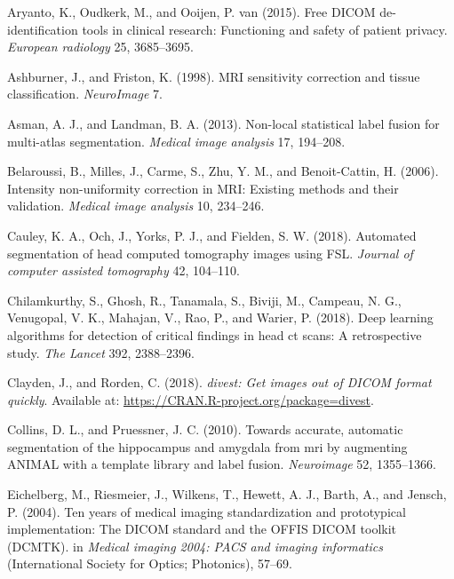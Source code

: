 \documentclass[utf8]{frontiersSCNS}
\begin{document}
\leavevmode\hypertarget{ref-aryanto2015free}{}%
Aryanto, K., Oudkerk, M., and Ooijen, P. van (2015). Free DICOM de-identification tools in clinical research: Functioning and safety of patient privacy. \emph{European radiology} 25, 3685--3695.

\leavevmode\hypertarget{ref-ashburner1998mri}{}%
Ashburner, J., and Friston, K. (1998). MRI sensitivity correction and tissue classification. \emph{NeuroImage} 7.

\leavevmode\hypertarget{ref-asman2013non}{}%
Asman, A. J., and Landman, B. A. (2013). Non-local statistical label fusion for multi-atlas segmentation. \emph{Medical image analysis} 17, 194--208.

\leavevmode\hypertarget{ref-belaroussi2006intensity}{}%
Belaroussi, B., Milles, J., Carme, S., Zhu, Y. M., and Benoit-Cattin, H. (2006). Intensity non-uniformity correction in MRI: Existing methods and their validation. \emph{Medical image analysis} 10, 234--246.

\leavevmode\hypertarget{ref-biasct}{}%
Cauley, K. A., Och, J., Yorks, P. J., and Fielden, S. W. (2018). Automated segmentation of head computed tomography images using FSL. \emph{Journal of computer assisted tomography} 42, 104--110.

\leavevmode\hypertarget{ref-cq500}{}%
Chilamkurthy, S., Ghosh, R., Tanamala, S., Biviji, M., Campeau, N. G., Venugopal, V. K., Mahajan, V., Rao, P., and Warier, P. (2018). Deep learning algorithms for detection of critical findings in head ct scans: A retrospective study. \emph{The Lancet} 392, 2388--2396.

\leavevmode\hypertarget{ref-divest}{}%
Clayden, J., and Rorden, C. (2018). \emph{divest: Get images out of DICOM format quickly}. Available at: \url{https://CRAN.R-project.org/package=divest}.

\leavevmode\hypertarget{ref-collins2010towards}{}%
Collins, D. L., and Pruessner, J. C. (2010). Towards accurate, automatic segmentation of the hippocampus and amygdala from mri by augmenting ANIMAL with a template library and label fusion. \emph{Neuroimage} 52, 1355--1366.

\leavevmode\hypertarget{ref-dcmtk}{}%
Eichelberg, M., Riesmeier, J., Wilkens, T., Hewett, A. J., Barth, A., and Jensch, P. (2004). Ten years of medical imaging standardization and prototypical implementation: The DICOM standard and the OFFIS DICOM toolkit (DCMTK). in \emph{Medical imaging 2004: PACS and imaging informatics} (International Society for Optics; Photonics), 57--69.
\end{document}
